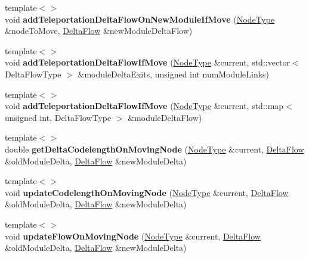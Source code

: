 \begin{DoxyCompactItemize}
\item 
\mbox{\label{classInfomapGreedySpecialized_abfc2696a5e37ccde0ef2e826e8862634}} 
{\footnotesize template$<$$>$ }\\void {\bfseries add\+Teleportation\+Delta\+Flow\+On\+New\+Module\+If\+Move} (\mbox{\hyperlink{classNode}{Node\+Type}} \&node\+To\+Move, \mbox{\hyperlink{structDeltaFlow}{Delta\+Flow}} \&new\+Module\+Delta\+Flow)
\item 
\mbox{\label{classInfomapGreedySpecialized_a74d832086c68afeeafebe629528d3cb5}} 
{\footnotesize template$<$$>$ }\\void {\bfseries add\+Teleportation\+Delta\+Flow\+If\+Move} (\mbox{\hyperlink{classNode}{Node\+Type}} \&current, std\+::vector$<$ Delta\+Flow\+Type $>$ \&module\+Delta\+Exits, unsigned int num\+Module\+Links)
\item 
\mbox{\label{classInfomapGreedySpecialized_ab9533b437c55107b55b89aeab4a53967}} 
{\footnotesize template$<$$>$ }\\void {\bfseries add\+Teleportation\+Delta\+Flow\+If\+Move} (\mbox{\hyperlink{classNode}{Node\+Type}} \&current, std\+::map$<$ unsigned int, Delta\+Flow\+Type $>$ \&module\+Delta\+Flow)
\item 
\mbox{\label{classInfomapGreedySpecialized_ab6d5f1312d7ecefeb06ee0812ea38d7f}} 
{\footnotesize template$<$$>$ }\\double {\bfseries get\+Delta\+Codelength\+On\+Moving\+Node} (\mbox{\hyperlink{classNode}{Node\+Type}} \&current, \mbox{\hyperlink{structDeltaFlow}{Delta\+Flow}} \&old\+Module\+Delta, \mbox{\hyperlink{structDeltaFlow}{Delta\+Flow}} \&new\+Module\+Delta)
\item 
\mbox{\label{classInfomapGreedySpecialized_ac092082ca150776f3827c1508c5b25b7}} 
{\footnotesize template$<$$>$ }\\void {\bfseries update\+Codelength\+On\+Moving\+Node} (\mbox{\hyperlink{classNode}{Node\+Type}} \&current, \mbox{\hyperlink{structDeltaFlow}{Delta\+Flow}} \&old\+Module\+Delta, \mbox{\hyperlink{structDeltaFlow}{Delta\+Flow}} \&new\+Module\+Delta)
\item 
\mbox{\label{classInfomapGreedySpecialized_a65b216131a08a0779095acec9572829b}} 
{\footnotesize template$<$$>$ }\\void {\bfseries update\+Flow\+On\+Moving\+Node} (\mbox{\hyperlink{classNode}{Node\+Type}} \&current, \mbox{\hyperlink{structDeltaFlow}{Delta\+Flow}} \&old\+Module\+Delta, \mbox{\hyperlink{structDeltaFlow}{Delta\+Flow}} \&new\+Module\+Delta)
\end{DoxyCompactItemize}
